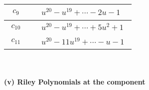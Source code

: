 \documentclass[1p]{elsarticle_modified}
\theoremstyle{definition}
\begin{document}
\begin{tabular}{m{50pt}|m{274pt}}
\hline $$\begin{aligned}c_{9}\end{aligned}$$&$\begin{aligned}
&u^{20}- u^{19}+\cdots-2 u-1
\end{aligned}$\\
\hline $$\begin{aligned}c_{10}\end{aligned}$$&$\begin{aligned}
&u^{20}- u^{19}+\cdots+5 u^2+1
\end{aligned}$\\
\hline $$\begin{aligned}c_{11}\end{aligned}$$&$\begin{aligned}
&u^{20}-11 u^{19}+\cdots- u-1
\end{aligned}$\\
\hline
\end{tabular}\\~\\
\newpage\renewcommand{\arraystretch}{1}
\flushleft \textbf{(v) Riley Polynomials at the component}\newline \\
\end{document}

